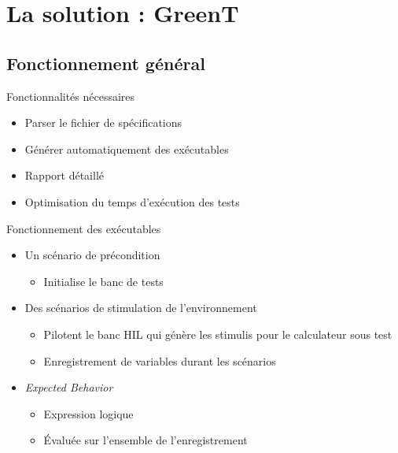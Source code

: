 \documentclass{beamer}
\begin{document}
\section{La solution : GreenT}
\subsection{Fonctionnement g\'en\'eral}
\begin{frame}{Fonctionnalités nécessaires}
\vspace{-10px}
	\begin{itemize}
		\item Parser le fichier de spécifications
		\item Générer automatiquement des  exécutables 
		\item Rapport détaillé
		\item Optimisation du temps d'exécution des tests
	\end{itemize}


\end{frame}
\begin{frame}{Fonctionnement des exécutables}
	\begin{itemize}
	  \vfill
		\item Un scénario de précondition
		\begin{itemize}
			\item Initialise le banc de tests
		\end{itemize}
		\pause
	\vfill
		\item Des scénarios de stimulation de l'environnement
			\begin{itemize}
			\item Pilotent le banc HIL qui génère les stimulis pour le calculateur sous test
			\item Enregistrement de variables durant les scénarios
			\end{itemize}
			\pause
	\vfill
		\item \textit{Expected Behavior }
			\begin{itemize}
				\item Expression logique 
				\item Évaluée sur l'ensemble de l'enregistrement
			\end{itemize}
	\vfill
	\end{itemize}
\end{frame}
\end{document}

